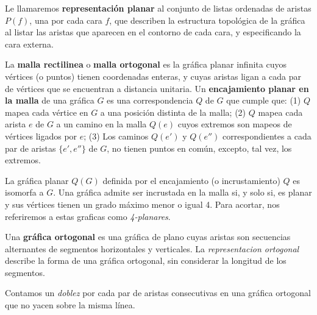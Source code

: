 \begin{definition}
Le llamaremos \textbf{representaci\'on planar} al conjunto de listas ordenadas de aristas $P(f)$, una por cada cara $f$, que describen la estructura topol\'ogica de la gr\'afica al listar las aristas que aparecen en el contorno de cada cara, y especificando la cara externa.
\end{definition}

\begin{definition}
La \textbf{malla rectilinea} o \textbf{malla ortogonal} es la gr\'afica planar infinita cuyos v\'ertices (o puntos) tienen coordenadas enteras, y cuyas aristas ligan a cada par de v\'ertices que se encuentran a distancia unitaria. Un \textbf{encajamiento planar en la malla} de una gr\'afica $G$ es una correspondencia $Q$ de $G$ que cumple que: (1) $Q$ mapea cada v\'ertice en $G$ a una posici\'on distinta de la malla; (2) $Q$ mapea cada arista $e$ de $G$ a un camino en la malla $Q(e)$ cuyos extremos son mapeos de v\'ertices ligados por $e$; (3) Los caminos $Q(e')$ y $Q(e'')$ correspondientes a cada par de aristas $\{e', e''\}$ de $G$, no tienen puntos en com\'un, excepto, tal vez, los extremos.
\end{definition}

\begin{figure}
\end{figure}

La gr\'afica planar $Q(G)$ definida por el encajamiento (o incrustamiento) $Q$ es isomorfa a $G$. Una gr\'afica admite ser incrustada en la malla si, y solo si, es planar y sus v\'ertices tienen un grado m\'aximo menor o igual 4. Para acortar, nos referiremos a estas graficas como \emph{4-planares}.

\begin{definition}
Una \textbf{gr\'afica ortogonal} es una gr\'afica de plano cuyas aristas son secuencias alternantes de segmentos horizontales y verticales. La \emph{representacion ortogonal} describe la forma de una gr\'afica ortogonal, sin considerar la longitud de los segmentos.
\end{definition}

\begin{definition}[Doblez]
Contamos un \emph{doblez}\cite{minbends} por cada par de aristas consecutivas en una gr\'afica ortogonal que no yacen sobre la misma l\'inea.
\end{definition}

